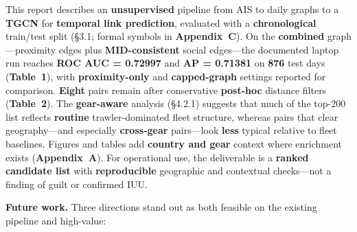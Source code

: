 \documentclass[
]{article}
\begin{document}
This report describes an \textbf{unsupervised} pipeline from AIS to
daily graphs to a \textbf{TGCN} for \textbf{temporal link prediction},
evaluated with a \textbf{chronological} train/test split (§3.1; formal
symbols in \textbf{Appendix~C}). On the \textbf{combined}
graph---proximity edges plus \textbf{MID-consistent} social edges---the
documented laptop run reaches \textbf{ROC AUC = 0.72997} and \textbf{AP
= 0.71381} on \textbf{876} test days (\textbf{Table~1}), with
\textbf{proximity-only} and \textbf{capped-graph} settings reported for
comparison. \textbf{Eight} pairs remain after conservative
\textbf{post-hoc} distance filters (\textbf{Table~2}). The
\textbf{gear-aware} analysis (§4.2.1) suggests that much of the top-200
list reflects \textbf{routine} trawler-dominated fleet structure,
whereas pairs that clear geography---and especially \textbf{cross-gear}
pairs---look \textbf{less} typical relative to fleet baselines. Figures
and tables add \textbf{country and gear} context where enrichment exists
(\textbf{Appendix~A}). For operational use, the deliverable is a
\textbf{ranked candidate list} with \textbf{reproducible} geographic and
contextual checks---not a finding of guilt or confirmed IUU.

\textbf{Future work.} Three directions stand out as both feasible on the
existing pipeline and high-value:
\end{document}
